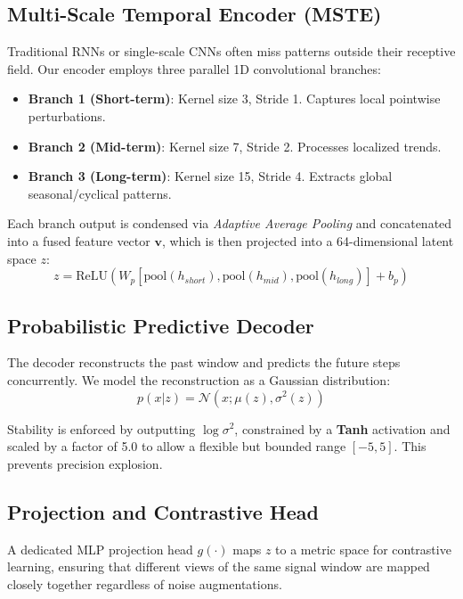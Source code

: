 \documentclass[12pt,a4paper]{article}
\begin{document}
\subsection{Multi-Scale Temporal Encoder (MSTE)}
Traditional RNNs or single-scale CNNs often miss patterns outside their receptive field. Our encoder employs three parallel 1D convolutional branches:
\begin{itemize}
    \item \textbf{Branch 1 (Short-term)}: Kernel size 3, Stride 1. Captures local pointwise perturbations.
    \item \textbf{Branch 2 (Mid-term)}: Kernel size 7, Stride 2. Processes localized trends.
    \item \textbf{Branch 3 (Long-term)}: Kernel size 15, Stride 4. Extracts global seasonal/cyclical patterns.
\end{itemize}

Each branch output is condensed via \textit{Adaptive Average Pooling} and concatenated into a fused feature vector $\mathbf{v}$, which is then projected into a 64-dimensional latent space $z$:
\begin{equation}
z = \text{ReLU}(W_p [\text{pool}(h_{short}), \text{pool}(h_{mid}), \text{pool}(h_{long})] + b_p)
\end{equation}

\subsection{Probabilistic Predictive Decoder}
The decoder reconstructs the past window and predicts the future steps concurrently. We model the reconstruction as a Gaussian distribution:
\begin{equation}
p(x | z) = \mathcal{N}(x; \mu(z), \sigma^2(z))
\end{equation}

Stability is enforced by outputting $\log \sigma^2$, constrained by a \textbf{Tanh} activation and scaled by a factor of 5.0 to allow a flexible but bounded range $[-5, 5]$. This prevents precision explosion.

\subsection{Projection and Contrastive Head}
A dedicated MLP projection head $g(\cdot)$ maps $z$ to a metric space for contrastive learning, ensuring that different views of the same signal window are mapped closely together regardless of noise augmentations.
\end{document}
